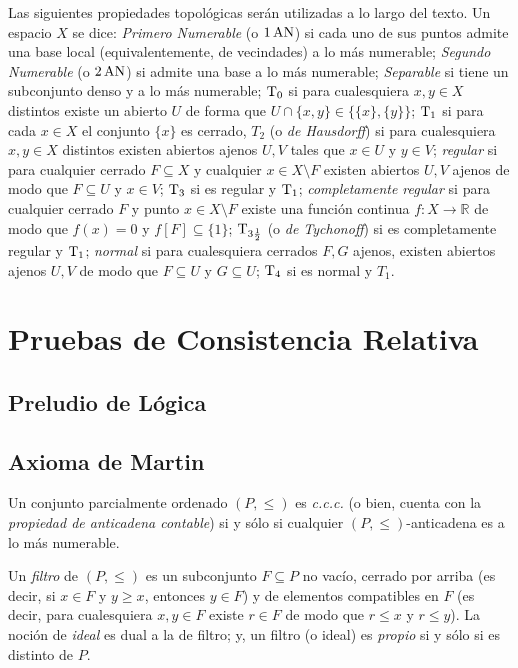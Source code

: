     Las siguientes propiedades topológicas serán utilizadas a lo largo del texto. Un espacio $X$ se dice: \textit{Primero Numerable} (o $1\operatorname{AN}$) si cada uno de sus puntos admite una base local (equivalentemente, de vecindades) a lo más numerable; \textit{Segundo Numerable} (o $2\operatorname{AN}$) si admite una base a lo más numerable; \textit{Separable} si tiene un subconjunto denso y a lo más numerable; $\operatorname{T}_0$ si para cualesquiera $x,y \in X$ distintos existe un abierto $U$ de forma que $U \cap \{x,y\} \in \{\{x\},\{y\}\}$; $\operatorname{T}_1$ si para cada $x \in X$ el conjunto $\{x\}$ es cerrado, $T_2$ (o \textit{de Hausdorff}) si para cualesquiera $x,y \in X$ distintos existen abiertos ajenos $U,V$ tales que $x \in U$ y $y \in V$; \textit{regular} si para cualquier cerrado $F \subseteq X$ y cualquier $x \in X \setminus F$ existen abiertos $U,V$ ajenos de modo que $F \subseteq U$ y $x \in V$; $\operatorname{T}_3$ si es regular y $\operatorname{T}_1$; \textit{completamente regular} si para cualquier cerrado $F$ y punto $x \in X \setminus F$ existe una función continua $f:X \to \mathbb{R}$ de modo que $f(x)=0$ y $f[F] \subseteq \{1\}$; $\operatorname{T}_{3 \frac{1}{2}}$ (o \textit{de Tychonoff}) si es completamente regular y $\operatorname{T}_1$; \textit{normal} si para cualesquiera cerrados $F,G$ ajenos, existen abiertos ajenos $U,V$ de modo que $F \subseteq U$ y $G \subseteq U$; $\operatorname{T}_4$ si es normal y $T_1$.













    \newpage
    \section{Pruebas de Consistencia Relativa}
    \subsection{Preludio de Lógica}
    \subsection{Axioma de Martin}

    Un conjunto parcialmente ordenado $(P,\leq)$ es \textit{c.c.c.} (o bien, cuenta con la \textit{propiedad de anticadena contable}) si y sólo si cualquier $(P,\leq)$-anticadena es a lo más numerable.

    Un \textit{filtro} de $(P,\leq)$ es un subconjunto $F \subseteq P$ no vacío, cerrado por arriba (es decir, si $x \in F$ y $y \geq x$, entonces $y \in F$) y de elementos compatibles en $F$ (es decir, para cualesquiera $x,y \in F$ existe $r \in F$ de modo que $r \leq x$ y $r \leq y$). La noción de \textit{ideal} es dual a la de filtro; y, un filtro (o ideal) es \textit{propio} si y sólo si es distinto de $P$.

